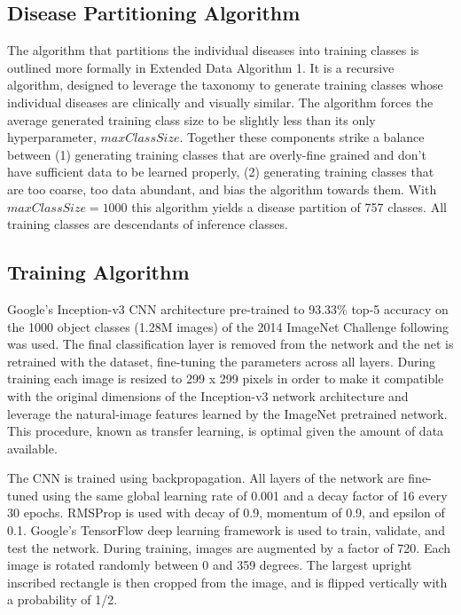 \subsection{Disease Partitioning Algorithm}
The algorithm that partitions the individual diseases into training classes is outlined more formally in Extended Data Algorithm 1. It is a recursive algorithm, designed to leverage the taxonomy to generate training classes whose individual diseases are clinically and visually similar. The algorithm forces the average generated training class size to be slightly less than its only hyperparameter, $maxClassSize$. Together these components strike a balance between (1) generating training classes that are overly-fine grained and don’t have sufficient data to be learned properly, (2) generating training classes that are too coarse, too data abundant, and bias the algorithm towards them. With $maxClassSize = 1000$ this algorithm yields a disease partition of 757 classes. All training classes are descendants of inference classes.

\subsection{Training Algorithm}
Google’s Inception-v3 CNN architecture pre-trained to 93.33\% top-5 accuracy on the 1000 object classes (1.28M images) of the 2014 ImageNet Challenge following \cite{szegedy2016rethinking} was used. The final classification layer is removed from the network and the net is retrained with the dataset, fine-tuning the parameters across all layers. During training each image is resized to 299 x 299 pixels in order to make it compatible with the original dimensions of the Inception-v3 network architecture and leverage the natural-image features learned by the ImageNet pretrained network. This procedure, known as transfer learning, is optimal given the amount of data available.

The CNN is trained using backpropagation. All layers of the network are fine-tuned using the same global learning rate of 0.001 and a decay factor of 16 every 30 epochs. RMSProp is used with decay of 0.9, momentum of 0.9, and epsilon of 0.1. Google’s TensorFlow \cite{abadi2016tensorflow} deep learning framework is used to train, validate, and test the network. During training, images are augmented by a factor of 720. Each image is rotated randomly between 0 and 359 degrees. The largest upright inscribed rectangle is then cropped from the image, and is flipped vertically with a probability of 1/2. 

